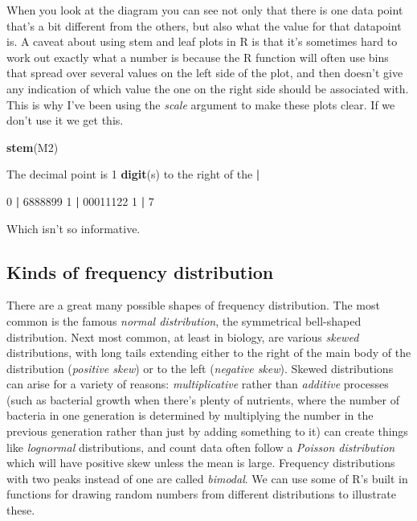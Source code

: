 \documentclass[
]{book}
\newenvironment{Shaded}{\begin{snugshade}}{\end{snugshade}}
\newcommand{\DecValTok}[1]{\textcolor[rgb]{0.00,0.00,0.81}{#1}}
\newcommand{\KeywordTok}[1]{\textcolor[rgb]{0.13,0.29,0.53}{\textbf{#1}}}
\newcommand{\NormalTok}[1]{#1}
\newcommand{\OperatorTok}[1]{\textcolor[rgb]{0.81,0.36,0.00}{\textbf{#1}}}
\newcommand{\StringTok}[1]{\textcolor[rgb]{0.31,0.60,0.02}{#1}}
\begin{document}
When you look at the diagram you can see not only that there is one data point that's a bit different from the others, but also what the value for that datapoint is. A caveat about using stem and leaf plots in R is that it's sometimes hard to work out exactly what a number is because the R function will often use bins that spread over several values on the left side of the plot, and then doesn't give any indication of which value the one on the right side should be associated with. This is why I've been using the \emph{scale} argument to make these plots clear. If we don't use it we get this.

\begin{Shaded}
\begin{Highlighting}[]
\KeywordTok{stem}\NormalTok{(M2)}

\NormalTok{  The decimal point is }\DecValTok{1} \KeywordTok{digit}\NormalTok{(s) to the right of the }\OperatorTok{|}

\StringTok{  }\DecValTok{0} \OperatorTok{|}\StringTok{ }\DecValTok{6888899}
  \DecValTok{1} \OperatorTok{|}\StringTok{ }\DecValTok{00011122}
  \DecValTok{1} \OperatorTok{|}\StringTok{ }\DecValTok{7}
\end{Highlighting}
\end{Shaded}

Which isn't so informative.

\hypertarget{kinds-of-frequency-distribution}{%
\subsection{Kinds of frequency distribution}\label{kinds-of-frequency-distribution}}

There are a great many possible shapes of frequency distribution. The most common is the famous \emph{normal distribution}, the symmetrical bell-shaped distribution. Next most common, at least in biology, are various \emph{skewed} distributions, with long tails extending either to the right of the main body of the distribution (\emph{positive skew}) or to the left (\emph{negative skew}). Skewed distributions can arise for a variety of reasons: \emph{multiplicative} rather than \emph{additive} processes (such as bacterial growth when there's plenty of nutrients, where the number of bacteria in one generation is determined by multiplying the number in the previous generation rather than just by adding something to it) can create things like \emph{lognormal} distributions, and count data often follow a \emph{Poisson distribution} which will have positive skew unless the mean is large. Frequency distributions with two peaks instead of one are called \emph{bimodal}. We can use some of R's built in functions for drawing random numbers from different distributions to illustrate these.
\end{document}
